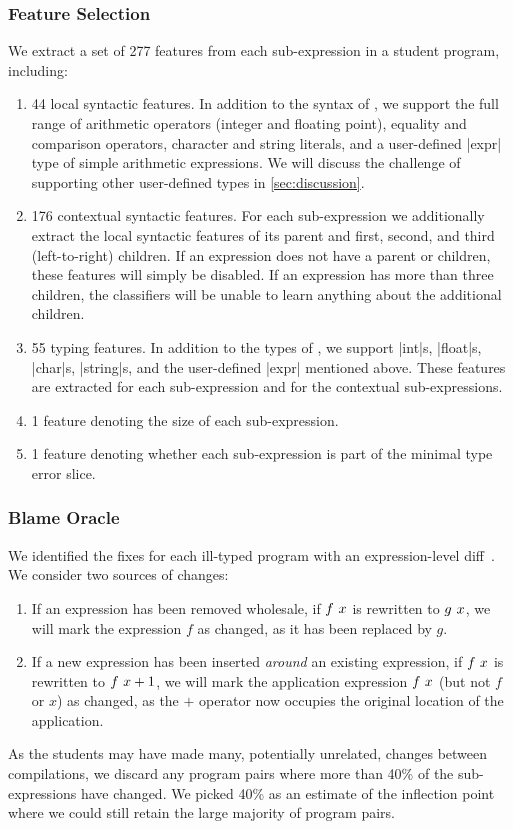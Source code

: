 \subsubsection{Feature Selection}
We extract a set of 277 features from each sub-expression in a student
program, including:
%
\begin{enumerate}
\item 44 local syntactic features. In addition to the syntax of \lang,
  we support the full range of arithmetic operators (integer and
  floating point), equality and comparison operators, character and
  string literals, and a user-defined |expr| type of simple arithmetic
  expressions. We will discuss the challenge of supporting other
  user-defined types in \autoref{sec:discussion}.
\item 176 contextual syntactic features. For each sub-expression we
  additionally extract the local syntactic features of its parent and
  first, second, and third (left-to-right) children. If an expression
  does not have a parent or children, these features will simply be
  disabled. If an expression has more than three children, the
  classifiers will be unable to learn anything about the additional
  children.
\item 55 typing features. In addition to the types of \lang, we support
  |int|s, |float|s, |char|s, |string|s, and the user-defined |expr|
  mentioned above. These features are extracted for each sub-expression
  and for the contextual sub-expressions.
\item 1 feature denoting the size of each sub-expression.
\item 1 feature denoting whether each sub-expression is part of the
  minimal type error slice.
\end{enumerate}

\subsubsection{Blame Oracle}
We identified the fixes for each ill-typed program with an
expression-level diff~\citep{Lempsink2009-xf}.
%
We consider two sources of changes:
%
\begin{enumerate}
\item If an expression has been removed wholesale, \eg if $f\ x$
  is rewritten to $g\ x$, we will mark the expression $f$ as
  changed, as it has been replaced by $g$.
\item If a new expression has been inserted \emph{around} an existing
  expression, \eg if $f\ x$ is rewritten to
  $f\ x + 1$, we will mark the application expression
  $f\ x$ (but not $f$ or $x$) as changed, as the $+$ operator now
  occupies the original location of the application.
\end{enumerate}
%
As the students may have made many, potentially unrelated, changes
between compilations, we discard any program pairs where more than 40\%
of the sub-expressions have changed.
%
We picked 40\% as an estimate of the inflection point where we could
still retain the large majority of program pairs.



